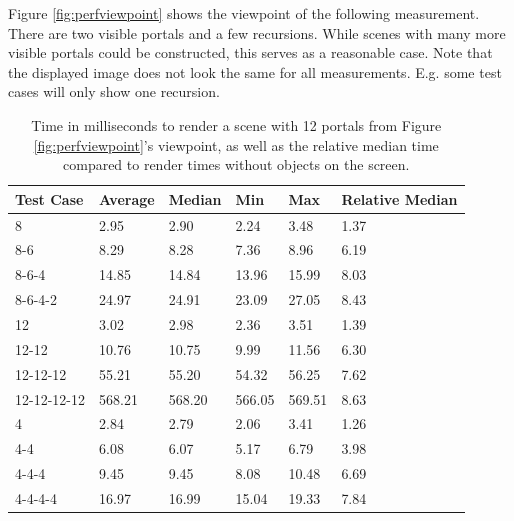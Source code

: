 Figure \ref{fig:perfviewpoint} shows the viewpoint of the following measurement. There are two visible portals and a few recursions. While scenes with many more visible portals could be constructed, this serves as a reasonable case. Note that the displayed image does not look the same for all measurements. E.g. some test cases will only show one recursion.

\begin{table}[H]
	\centering
	\begin{tabular}{|l|l|l|l|l|l|}
		\hline
		Test Case   & Average & Median & Min    & Max    & Relative Median \\ \hline
		8           & 2.95    & 2.90   & 2.24   & 3.48   & 1.37            \\ \hline
		8-6         & 8.29    & 8.28   & 7.36   & 8.96   & 6.19            \\ \hline
		8-6-4       & 14.85   & 14.84  & 13.96  & 15.99  & 8.03            \\ \hline
		8-6-4-2     & 24.97   & 24.91  & 23.09  & 27.05  & 8.43            \\ \hline
		12          & 3.02    & 2.98   & 2.36   & 3.51   & 1.39            \\ \hline
		12-12       & 10.76   & 10.75  & 9.99   & 11.56  & 6.30            \\ \hline
		12-12-12    & 55.21   & 55.20  & 54.32  & 56.25  & 7.62            \\ \hline
		12-12-12-12 & 568.21  & 568.20 & 566.05 & 569.51 & 8.63            \\ \hline
		4           & 2.84    & 2.79   & 2.06   & 3.41   & 1.26            \\ \hline
		4-4         & 6.08    & 6.07   & 5.17   & 6.79   & 3.98            \\ \hline
		4-4-4       & 9.45    & 9.45   & 8.08   & 10.48  & 6.69            \\ \hline
		4-4-4-4     & 16.97   & 16.99  & 15.04  & 19.33  & 7.84            \\ \hline
	\end{tabular}
	\caption{Time in milliseconds to render a scene with 12 portals from Figure \ref{fig:perfviewpoint}'s viewpoint, as well as the relative median time compared to render times without objects on the screen.}
	\label{tab:perfviewpoint}
\end{table}

